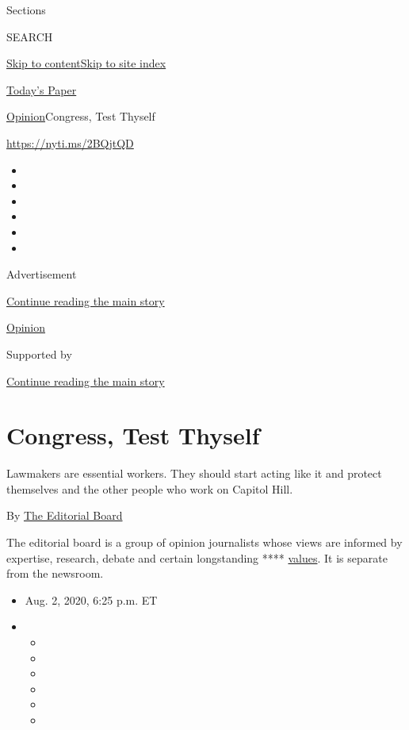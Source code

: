 Sections

SEARCH

\protect\hyperlink{site-content}{Skip to
content}\protect\hyperlink{site-index}{Skip to site index}

\href{https://myaccount.nytimes3xbfgragh.onion/auth/login?response_type=cookie\&client_id=vi}{}

\href{https://www.nytimes3xbfgragh.onion/section/todayspaper}{Today's
Paper}

\href{/section/opinion}{Opinion}\textbar{}Congress, Test Thyself

\url{https://nyti.ms/2BQjtQD}

\begin{itemize}
\item
\item
\item
\item
\item
\item
\end{itemize}

Advertisement

\protect\hyperlink{after-top}{Continue reading the main story}

\href{/section/opinion}{Opinion}

Supported by

\protect\hyperlink{after-sponsor}{Continue reading the main story}

\hypertarget{congress-test-thyself}{%
\section{Congress, Test Thyself}\label{congress-test-thyself}}

Lawmakers are essential workers. They should start acting like it and
protect themselves and the other people who work on Capitol Hill.

By
\href{https://www.nytimes3xbfgragh.onion/interactive/opinion/editorialboard.html}{The
Editorial Board}

The editorial board is a group of opinion journalists whose views are
informed by expertise, research, debate and certain longstanding ****
\href{https://www.nytimes3xbfgragh.onion/interactive/2018/opinion/editorialboard.html}{values}.
It is separate from the newsroom.

\begin{itemize}
\item
  Aug. 2, 2020, 6:25 p.m. ET
\item
  \begin{itemize}
  \item
  \item
  \item
  \item
  \item
  \item
  \end{itemize}
\end{itemize}

